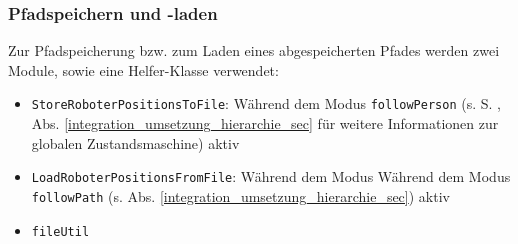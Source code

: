 \subsubsection{Pfadspeichern und -laden}
\label{bahnplanung_pfadSpeichernLaden_subsubsec}


Zur Pfadspeicherung bzw. zum Laden eines abgespeicherten Pfades werden zwei Module, sowie eine Helfer-Klasse verwendet:
\begin{itemize}
	\item \lstinline{StoreRoboterPositionsToFile}: Während dem Modus \lstinline{followPerson} (s. S. \pageref{integration_umsetzung_hierarchie_sec}, Abs. \ref{integration_umsetzung_hierarchie_sec} für weitere Informationen zur globalen Zustandsmaschine) aktiv
	\item \lstinline{LoadRoboterPositionsFromFile}: Während dem Modus Während dem Modus \lstinline{followPath} (s. Abs. \ref{integration_umsetzung_hierarchie_sec}) aktiv
	\item \lstinline{fileUtil}
\end{itemize}

